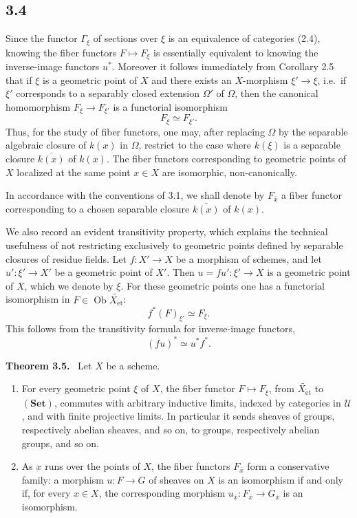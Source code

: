 \documentclass[11pt]{article}
\newcommand{\U}{\mathcal{U}}
\newcommand{\Ob}{\operatorname{Ob}}
\newcommand{\et}{\mathrm{\acute{e}t}}
\newcommand{\ie}{i.e.\ }
\newenvironment{statement}[1]{\par\medskip\noindent\textbf{#1.}\ }{\par\medskip}
\begin{document}
\subsection*{3.4}
Since the functor \(\Gamma_\xi\) of sections over \(\xi\) is an equivalence of categories (2.4), knowing the fiber functors \(F\mapsto F_\xi\) is essentially equivalent to knowing the inverse-image functors \(u^*\). Moreover it follows immediately from Corollary 2.5 that if \(\xi\) is a geometric point of \(X\) and there exists an \(X\)-morphism \(\xi'\to\xi\), \ie if \(\xi'\) corresponds to a separably closed extension \(\Omega'\) of \(\Omega\), then the canonical homomorphism \(F_\xi\to F_{\xi'}\) is a functorial isomorphism
\[
F_\xi\simeq F_{\xi'}.
\]
Thus, for the study of fiber functors, one may, after replacing \(\Omega\) by the separable algebraic closure of \(k(x)\) in \(\Omega\), restrict to the case where \(k(\xi)\) is a separable closure \(\bar{k(x)}\) of \(k(x)\). The fiber functors corresponding to geometric points of \(X\) localized at the same point \(x\in X\) are isomorphic, non-canonically.

In accordance with the conventions of 3.1, we shall denote by \(F_{\bar x}\) a fiber functor corresponding to a chosen separable closure \(\bar{k(x)}\) of \(k(x)\).

We also record an evident transitivity property, which explains the technical usefulness of not restricting exclusively to geometric points defined by separable closures of residue fields. Let \(f:X'\to X\) be a morphism of schemes, and let \(u':\xi'\to X'\) be a geometric point of \(X'\). Then \(u=fu':\xi'\to X\) is a geometric point of \(X\), which we denote by \(\xi\). For these geometric points one has a functorial isomorphism in \(F\in\Ob\widetilde{X_{\et}}\):
\[
f^*(F)_{\xi'}\simeq F_\xi.
\]
This follows from the transitivity formula for inverse-image functors,
\[
(fu)^*\simeq u^*f^*.
\]

\begin{statement}{Theorem 3.5}
Let \(X\) be a scheme.
\begin{enumerate}[label=\alph*)]
\item For every geometric point \(\xi\) of \(X\), the fiber functor \(F\mapsto F_\xi\), from \(\widetilde{X_{\et}}\) to \((\mathbf{Set})\), commutes with arbitrary inductive limits, indexed by categories in \(\U\), and with finite projective limits. In particular it sends sheaves of groups, respectively abelian sheaves, and so on, to groups, respectively abelian groups, and so on.
\item As \(x\) runs over the points of \(X\), the fiber functors \(F_{\bar x}\) form a conservative family: a morphism \(u:F\to G\) of sheaves on \(X\) is an isomorphism if and only if, for every \(x\in X\), the corresponding morphism \(u_{\bar x}:F_{\bar x}\to G_{\bar x}\) is an isomorphism.
\end{enumerate}
\end{statement}
\end{document}

